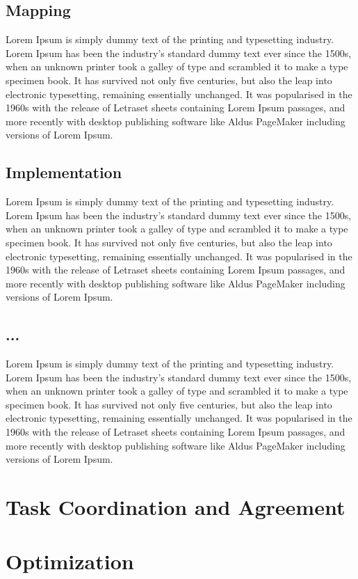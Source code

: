 \subsection{Mapping}
Lorem Ipsum is simply dummy text of the printing and typesetting industry. Lorem Ipsum has been the industry's standard dummy text ever since the 1500s, when an unknown printer took a galley of type and scrambled it to make a type specimen book. It has survived not only five centuries, but also the leap into electronic typesetting, remaining essentially unchanged. It was popularised in the 1960s with the release of Letraset sheets containing Lorem Ipsum passages, and more recently with desktop publishing software like Aldus PageMaker including versions of Lorem Ipsum.

\subsection{Implementation}
Lorem Ipsum is simply dummy text of the printing and typesetting industry. Lorem Ipsum has been the industry's standard dummy text ever since the 1500s, when an unknown printer took a galley of type and scrambled it to make a type specimen book. It has survived not only five centuries, but also the leap into electronic typesetting, remaining essentially unchanged. It was popularised in the 1960s with the release of Letraset sheets containing Lorem Ipsum passages, and more recently with desktop publishing software like Aldus PageMaker including versions of Lorem Ipsum.

\subsection{...}
Lorem Ipsum is simply dummy text of the printing and typesetting industry. Lorem Ipsum has been the industry's standard dummy text ever since the 1500s, when an unknown printer took a galley of type and scrambled it to make a type specimen book. It has survived not only five centuries, but also the leap into electronic typesetting, remaining essentially unchanged. It was popularised in the 1960s with the release of Letraset sheets containing Lorem Ipsum passages, and more recently with desktop publishing software like Aldus PageMaker including versions of Lorem Ipsum.

\section{Task Coordination and Agreement}
\section{Optimization}
